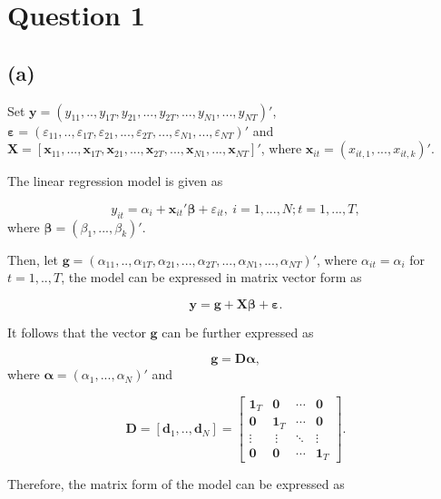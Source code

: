 \documentclass[
]{article}
\author{}
\date{\vspace{-2.5em}}
\begin{document}
\hypertarget{question-1}{%
\section{Question 1}\label{question-1}}

\hypertarget{a}{%
\subsection{(a)}\label{a}}

Set
\(\boldsymbol{y} = (y_{11},..,y_{1T},y_{21},...,y_{2T},...,y_{N1},...,y_{NT})'\),
\(\boldsymbol{\varepsilon} = (\varepsilon_{11},..,\varepsilon_{1T},\varepsilon_{21},...,\varepsilon_{2T},...,\varepsilon_{N1},...,\varepsilon_{NT})'\)
and
\(\boldsymbol{X} = [\boldsymbol{x}_{11},...,\boldsymbol{x}_{1T},\boldsymbol{x}_{21},...,\boldsymbol{x}_{2T},...,\boldsymbol{x}_{N1},...,\boldsymbol{x}_{NT}]'\),
where \(\boldsymbol{x}_{it}=(x_{it,1},...,x_{it,k})'\).

The linear regression model is given as

\[y_{it} = \alpha_i+\boldsymbol{x}_{it}'\boldsymbol{\beta}+\varepsilon_{it}, ~i=1,...,N;t=1,...,T,\]
where \(\boldsymbol{\beta} = (\beta_1, ..., \beta_k)'\).

Then, let
\(\boldsymbol{g} = (\alpha_{11},..,\alpha_{1T},\alpha_{21},...,\alpha_{2T},...,\alpha_{N1},...,\alpha_{NT})'\),
where \(\alpha_{it} = \alpha_{i}\) for \(t=1,..,T\), the model can be
expressed in matrix vector form as

\[\boldsymbol{y} = \boldsymbol{g} + \boldsymbol{X}\boldsymbol{\beta} + \boldsymbol{\varepsilon}.\]

It follows that the vector \(\boldsymbol{g}\) can be further expressed
as

\[\boldsymbol{g} = \boldsymbol{D}\boldsymbol{\alpha},\] where
\(\boldsymbol{\alpha} = (\alpha_1, ..., \alpha_N)'\) and

\[\boldsymbol{D} = [\boldsymbol{d}_1, .., \boldsymbol{d}_N]= \begin{bmatrix}\boldsymbol{1}_T & \boldsymbol{0} & \cdots & \boldsymbol{0} \\ \boldsymbol{0} & \boldsymbol{1}_T & \cdots & \boldsymbol{0} \\ \vdots &\ \vdots & \ddots & \vdots \\ \boldsymbol{0} & \boldsymbol{0} & \cdots & \boldsymbol{1}_T\end{bmatrix}.\]

Therefore, the matrix form of the model can be expressed as
\end{document}
